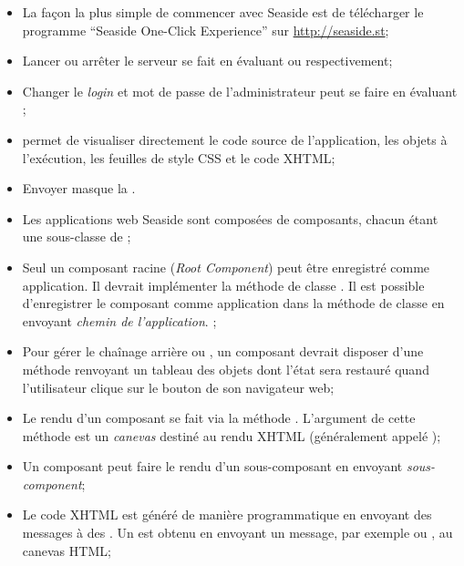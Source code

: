 \documentclass[a4paper,10pt,twoside]{book}
\begin{document}
\begin{itemize}
  \item La façon la plus simple de commencer avec Seaside est de
    télécharger le programme ``Seaside One-Click Experience'' sur
    \url{http://seaside.st};
  \item Lancer ou arrêter le serveur se fait en évaluant  
ou  respectivement;
  \item Changer le \emph{login} et mot de passe de l'administrateur
    peut se faire en évaluant ;
  \item {} permet de visualiser directement le code
    source de l'application, les objets à l'exécution, les feuilles de
    style CSS et le code XHTML;
  \item Envoyer  masque la
    \toolbar.
  \item Les applications web Seaside sont composées de composants,
    chacun étant une sous-classe de ;
  \item Seul un composant racine (\emph{Root Component}) peut être
    enregistré comme application. 
Il devrait implémenter la méthode de classe . Il est
possible d'enregistrer le composant comme application dans la
méthode de classe  en envoyant
 \emph{chemin de l'application}.
; %
  \item Pour gérer le chaînage arrière ou \backtracking, un composant
    devrait disposer d'une méthode  renvoyant un tableau des
    objets dont l'état sera restauré quand l'utilisateur clique sur le
    bouton \backbtn de son navigateur web;
  \item Le rendu d'un composant se fait via la méthode
    . L'argument de cette méthode est un
    \emph{canevas} destiné au rendu XHTML (généralement appelé
    );
  \item Un composant peut faire le rendu d'un sous-composant en
    envoyant  \emph{sous-component};
  \item Le code XHTML est généré de manière programmatique en envoyant
    des messages à des \brushes. Un \brush est obtenu en envoyant un
    message, par exemple  ou , au canevas HTML;

\end{itemize}
\end{document}
